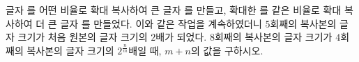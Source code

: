 글자 를 어떤 비율로 확대 복사하여 큰 글자 를 만들고, 확대한 를 같은 비율로 확대 복사하여 더 큰 글자 를 만들었다. 이와 같은 작업을 계속하였더니 $5$회째의 복사본의 글자 크기가 처음 원본의 글자 크기의 $2$배가 되었다. $8$회째의 복사본의 글자 크기가 $4$회째의 복사본의 글자 크기의 $2^{\frac{n}{m}}$배일 때, $m+n$의 값을 구하시오. 
